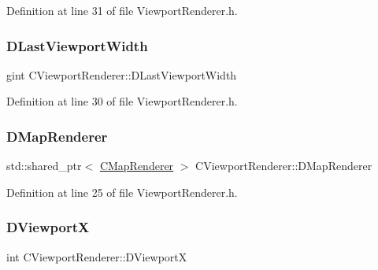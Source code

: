 Definition at line 31 of file Viewport\+Renderer.\+h.

\hypertarget{classCViewportRenderer_aaa21acd1b43badc3c1a3b0bf9b0f86f9}{}\label{classCViewportRenderer_aaa21acd1b43badc3c1a3b0bf9b0f86f9} 
\subsubsection{\texorpdfstring{D\+Last\+Viewport\+Width}{DLastViewportWidth}}
{\footnotesize\ttfamily gint C\+Viewport\+Renderer\+::\+D\+Last\+Viewport\+Width\hspace{0.3cm}{\ttfamily [protected]}}



Definition at line 30 of file Viewport\+Renderer.\+h.

\hypertarget{classCViewportRenderer_ac6bc7771bd6dcd35107d25bebb0c0a4c}{}\label{classCViewportRenderer_ac6bc7771bd6dcd35107d25bebb0c0a4c} 
\subsubsection{\texorpdfstring{D\+Map\+Renderer}{DMapRenderer}}
{\footnotesize\ttfamily std\+::shared\+\_\+ptr$<$ \hyperlink{classCMapRenderer}{C\+Map\+Renderer} $>$ C\+Viewport\+Renderer\+::\+D\+Map\+Renderer\hspace{0.3cm}{\ttfamily [protected]}}



Definition at line 25 of file Viewport\+Renderer.\+h.

\hypertarget{classCViewportRenderer_aea9e05347f71a8e6b83439aab653be18}{}\label{classCViewportRenderer_aea9e05347f71a8e6b83439aab653be18} 
\subsubsection{\texorpdfstring{D\+ViewportX}{DViewportX}}
{\footnotesize\ttfamily int C\+Viewport\+Renderer\+::\+D\+ViewportX\hspace{0.3cm}{\ttfamily [protected]}}



